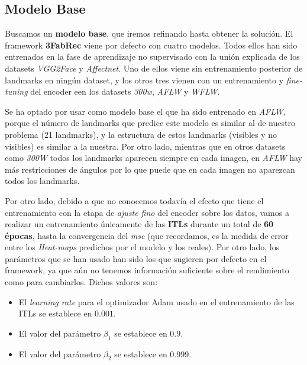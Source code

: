    \subsection{Modelo Base}
        \noindent Buscamos un \textbf{modelo base}, que iremos refinando hasta obtener la solución. El framework \textbf{3FabRec} viene por defecto con cuatro modelos. Todos ellos han sido entrenados en la fase de aprendizaje no supervisado con la unión explicada de los datasets \textit{VGG2Face} y \textit{Affectnet}. Uno de ellos viene sin entrenamiento posterior de landmarks en ningún dataset, y los otros tres vienen con un entrenamiento y \textit{fine-tuning} del encoder een los datasets \textit{300w}, \textit{AFLW} y \textit{WFLW}.

        \medskip

        \noindent Se ha optado por usar como modelo base el que ha sido entrenado en \textit{AFLW}, porque el número de landmarks que predice este modelo es similar al de nuestro problema (21 landmarks), y la estructura de estos landmarks (visibles y no visibles) es similar a la nuestra. Por otro lado, mientras que en otros datasets como \textit{300W} todos los landmarks aparecen siempre en cada imagen, en \textit{AFLW} hay más restricciones de ángulos por lo que puede que en cada imagen no aparezcan todos los landmarks.

        \medskip

        \noindent Por otro lado, debido a que no conocemos todavía el efecto que tiene el entrenamiento con la etapa de \textit{ajuste fino} del encoder sobre los datos, vamos a realizar un entrenamiento únicamente de las \textbf{ITLs} durante un total de \textbf{60 épocas}, hasta la convergencia del \textit{mse} (que recordamos, es la medida de error entre los \textit{Heat-maps} predichos por el modelo y los reales). Por otro lado, los parámetros que se han usado han sido los que sugieren por defecto en el framework, ya que aún no tenemos información suficiente sobre el rendimiento como para cambiarlos. Dichos valores son: 

        \begin{itemize}
            \item El \textit{learning rate} para el optimizador Adam usado en el entrenamiento de las ITLs se establece en $0.001$. 
            \item El valor del parámetro $\beta_1$ se establece en $0.9$.
            \item El valor del parámetro $\beta_2$ se establece en $0.999$.
        \end{itemize}

